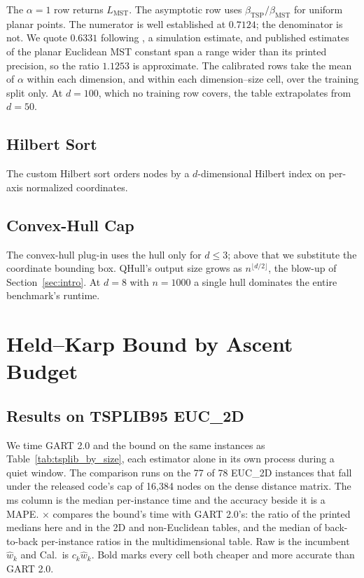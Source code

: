 \documentclass{article}
\begin{document}
The $\alpha=1$ row returns $L_{\mathrm{MST}}$. The asymptotic row uses $\beta_{\mathrm{TSP}}/\beta_{\mathrm{MST}}$ for uniform planar points. The numerator is well established at $0.7124$; the denominator is not. We quote $0.6331$ following \citet{cortinaborja2000mst}, a simulation estimate, and published estimates of the planar Euclidean MST constant span a range wider than its printed precision, so the ratio $1.1253$ is approximate. The calibrated rows take the mean of $\alpha$ within each dimension, and within each dimension--size cell, over the training split only. At $d=100$, which no training row covers, the table extrapolates from $d=50$.

\subsection{Hilbert Sort}

The custom Hilbert sort orders nodes by a $d$-dimensional Hilbert index \citep{hilbert1891} on per-axis normalized coordinates.





\subsection{Convex-Hull Cap}

The convex-hull plug-in uses the hull only for $d\le3$; above that we substitute the coordinate bounding box. QHull's output size grows as $n^{\lfloor d/2\rfloor}$, the blow-up of Section~\ref{sec:intro}. At $d=8$ with $n=1000$ a single hull dominates the entire benchmark's runtime.

\section{Held--Karp Bound by Ascent Budget} \label{app:ladders}

\subsection{Results on TSPLIB95 EUC\_2D} \label{subsec:frontier_tsplib}

We time GART 2.0 and the bound on the same instances as Table~\ref{tab:tsplib_by_size}, each estimator alone in its own process during a quiet window. The comparison runs on the 77 of 78 EUC\_2D instances that fall under the released code's cap of 16{,}384 nodes on the dense distance matrix. The ms column is the median per-instance time and the accuracy beside it is a MAPE. $\times$ compares the bound's time with GART 2.0's: the ratio of the printed medians here and in the 2D and non-Euclidean tables, and the median of back-to-back per-instance ratios in the multidimensional table. Raw is the incumbent $\hat w_k$ and Cal.\ is $c_k\hat w_k$. Bold marks every cell both cheaper and more accurate than GART 2.0.
\end{document}
